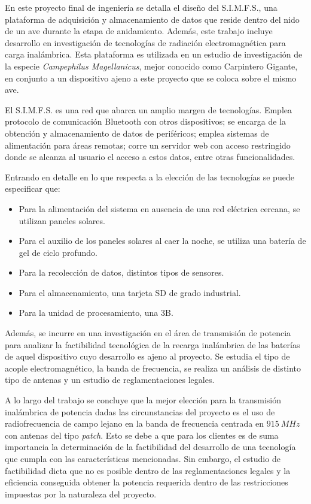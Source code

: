 En este proyecto final de ingeniería se detalla el diseño del S.I.M.F.S., una plataforma de adquisición y almacenamiento de datos que reside dentro del nido de un ave durante la etapa de anidamiento. Además, este trabajo incluye desarrollo en investigación de tecnologías de radiación electromagnética para carga inalámbrica. Esta plataforma es utilizada en un estudio de investigación de la especie \textit{Campephilus Magellanicus}, mejor conocido como Carpintero Gigante, en conjunto a un dispositivo ajeno a este proyecto que se coloca sobre el mismo ave.

El S.I.M.F.S. es una red que abarca un amplio margen de tecnologías. Emplea protocolo de comunicación Bluetooth con otros dispositivos; se encarga de la obtención y almacenamiento de datos de periféricos; emplea sistemas de alimentación para áreas remotas; corre un servidor web con acceso restringido donde se alcanza al usuario el acceso a estos datos, entre otras funcionalidades.


Entrando en detalle en lo que respecta a la elección de las tecnologías se puede especificar que:
\begin{itemize}
	\item Para la alimentación del sistema en ausencia de una red eléctrica cercana, se utilizan paneles solares.
	\item Para el auxilio de los paneles solares al caer la noche, se utiliza una batería de gel de ciclo profundo.
	\item Para la recolección de datos, distintos tipos de sensores.
	\item Para el almacenamiento, una tarjeta SD de grado industrial.
	\item Para la unidad de procesamiento, una \rspi 3B.
\end{itemize}

Además, se incurre en una investigación en el área de transmisión de potencia para analizar la factibilidad tecnológica de la recarga inalámbrica de las baterías de aquel dispositivo cuyo desarrollo es ajeno al proyecto. Se estudia el tipo de acople electromagnético, la banda de frecuencia, se realiza un análisis de distinto tipo de antenas y un estudio de reglamentaciones legales.

A lo largo del trabajo se concluye que la mejor elección para la transmisión inalámbrica de potencia dadas las circunstancias del proyecto es el uso de radiofrecuencia de campo lejano en la banda de frecuencia centrada en $915 \ MHz$ con antenas del tipo \textit{patch}. Esto se debe a que para los clientes es de suma importancia la determinación de la factibilidad del desarrollo de una tecnología que cumpla con las características mencionadas. Sin embargo, el estudio de factibilidad dicta que no es posible dentro de las reglamentaciones legales y la eficiencia conseguida obtener la potencia requerida dentro de las restricciones impuestas por la naturaleza del proyecto.

